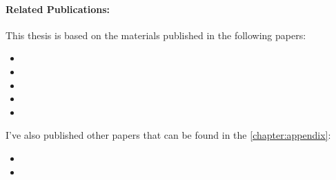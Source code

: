 \paragraph{Related Publications:} This thesis is based on the materials published in the following papers:

\begin{itemize}
      \item {}
      \item {}
      \item {}
      \item {}
      \item {}
\end{itemize}

I've also published other papers that can be found in the \autoref{chapter:appendix}:

\begin{itemize}
      \item {}
      \item {}
\end{itemize}

